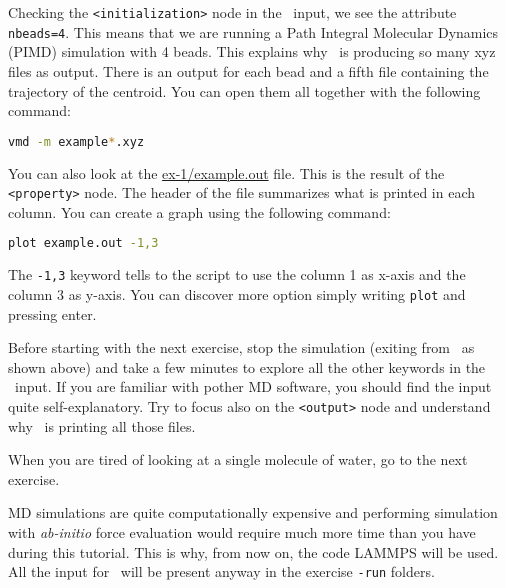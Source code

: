 \documentclass{article}
\begin{document}
\begin{Exercise}[label={i-pi},title={PIMD: a client/server approach}]
\Question
Checking the \texttt{<initialization>} node in the \ipi\ input, we see
the attribute \texttt{nbeads=4}. This means that we are running a Path
Integral Molecular Dynamics (PIMD) simulation with 4 beads.
This explains why \ipi\ is producing so many xyz files as output. There
is an output for each bead and a fifth file containing the trajectory
of the centroid. You can open them all together with the following
command:
\begin{lstlisting}[language=bash]
vmd -m example*.xyz
\end{lstlisting}
You can also look at the \url{ex-1/example.out} file. This is the
result of the \texttt{<property>} node. The header of the file
summarizes what is printed in each column. You can create a graph using
the following command:
\begin{lstlisting}[language=bash]
plot example.out -1,3
\end{lstlisting}
The \texttt{-1,3} keyword tells to the script to use the column 1 as
x-axis and the column 3 as y-axis. You can discover more option simply
writing \texttt{plot} and pressing enter.
\end{Exercise}
\vspace{1em}

Before starting with the next exercise, stop the simulation (exiting
from \ipi\ as shown above) and  take a few minutes to explore
all the other keywords in the \ipi\ input. If you are familiar with
pother MD software, you should find the input quite self-explanatory.
Try to focus also on the \texttt{<output>} node and understand why
\ipi\ is printing all those files.


When you are tired of looking at a single molecule of water, go to the
next exercise.

MD simulations are quite computationally expensive and performing
simulation with \emph{ab-initio} force evaluation would require much
more time than you have during this tutorial. This is why,
from now on, the code LAMMPS will be used. All the
input for \qe\ will be present anyway in the exercise \texttt{-run} folders.

\vspace{2em}
\end{document}
